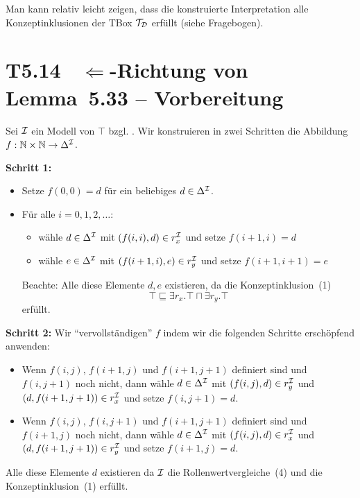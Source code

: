 \documentclass[fontsize=11pt, twoside=false, numbers=autoenddot]{scrbook}
\begin{document}
Man kann relativ leicht zeigen, dass die konstruierte Interpretation
alle Konzeptinklusionen der TBox $\mathcal{T}_{\mathcal{D}}$ erfüllt
(siehe Fragebogen).



\section*{T5.14~ $\Leftarrow$-Richtung von Lemma~5.33 -- Vorbereitung}

Sei $\mathcal{I}$ ein Modell von $\top$ bzgl. \Tmc.
Wir konstruieren in zwei Schritten die Abbildung
$f:\mathbb{N}\times\mathbb{N}\to \Delta^\mathcal{I}$.

\smallskip
\textbf{Schritt 1:}

\begin{itemize}

  \item Setze $f(0,0)=d$ für ein beliebiges $d\in \Delta^\mathcal{I}$.

  \item Für alle $i=0,1,2,\ldots$:

    \begin{itemize}

      \item wähle $d\in \Delta^\mathcal{I}$ mit $(f(i,i),d)\in r_x^\mathcal{I}$ und
	setze $f(i+1,i)=d$

      \item wähle $e\in \Delta^\mathcal{I}$ mit $(f(i+1,i),e)\in r_y^\mathcal{I}$ und
	setze $f(i+1,i+1)=e$

    \end{itemize}

    Beachte: Alle diese Elemente $d,e$ existieren, da \Imc die
    Konzeptinklusion~(1)
    \[\top\sqsubseteq \exists r_x.\top\sqcap \exists
    r_y.\top\] 
    erfüllt.

\end{itemize}

\smallskip
\textbf{Schritt 2:} Wir ``vervollständigen'' $f$ indem wir die
folgenden Schritte erschöpfend anwenden: 
%
\begin{itemize}

  \item Wenn $f(i,j)$, $f(i+1,j)$ und $f(i+1,j+1)$ definiert sind und
    $f(i,j+1)$ noch nicht, dann wähle $d\in \Delta^\mathcal{I}$ mit
    $(f(i,j),d)\in r_y^\mathcal{I}$ und $(d,f(i+1,j+1))\in r_x^\mathcal{I}$ und
    setze $f(i,j+1)=d$.

  \item Wenn $f(i,j)$, $f(i,j+1)$ und $f(i+1,j+1)$ definiert sind und
    $f(i+1,j)$ noch nicht, dann wähle $d\in \Delta^\mathcal{I}$ mit
    $(f(i,j),d)\in r_x^\mathcal{I}$ und $(d,f(i+1,j+1))\in r_y^\mathcal{I}$ und
    setze $f(i+1,j)=d$.

\end{itemize}
%
Alle diese Elemente $d$ existieren da $\mathcal{I}$ die
Rollenwertvergleiche~(4) und die Konzeptinklusion~(1) erfüllt. 
\end{document}
